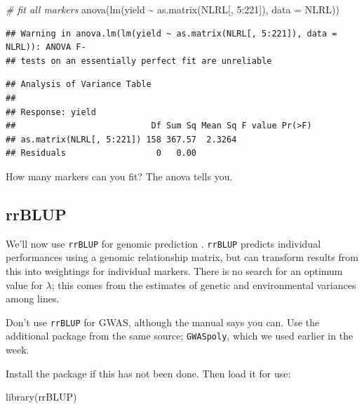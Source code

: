 \documentclass[
]{book}
\makeatletter
\newenvironment{Shaded}{\begin{snugshade}}{\end{snugshade}}
\newcommand{\AttributeTok}[1]{\textcolor[rgb]{0.77,0.63,0.00}{#1}}
\newcommand{\CommentTok}[1]{\textcolor[rgb]{0.56,0.35,0.01}{\textit{#1}}}
\newcommand{\DecValTok}[1]{\textcolor[rgb]{0.00,0.00,0.81}{#1}}
\newcommand{\FunctionTok}[1]{\textcolor[rgb]{0.00,0.00,0.00}{#1}}
\newcommand{\NormalTok}[1]{#1}
\newcommand{\SpecialCharTok}[1]{\textcolor[rgb]{0.00,0.00,0.00}{#1}}
\newenvironment{kframe}{%
\medskip{}
\setlength{\fboxsep}{.8em}
 \def\at@end@of@kframe{}%
 \ifinner\ifhmode%
  \def\at@end@of@kframe{\end{minipage}}%
  \begin{minipage}{\columnwidth}%
 \fi\fi%
 \def\FrameCommand##1{\hskip\@totalleftmargin \hskip-\fboxsep
 \colorbox{shadecolor}{##1}\hskip-\fboxsep
     \hskip-\linewidth \hskip-\@totalleftmargin \hskip\columnwidth}%
 \MakeFramed {\advance\hsize-\width
   \@totalleftmargin\z@ \linewidth\hsize
   \@setminipage}}%
 {\par\unskip\endMakeFramed%
 \at@end@of@kframe}
\newenvironment{rmdblock}[1]
  {
  \begin{itemize}
  \renewcommand{\labelitemi}{
    \raisebox{-.7\height}[0pt][0pt]{
      {\setkeys{Gin}{width=3em,keepaspectratio}\texttt{[image: images/\#1]}}
    }
  }
  \setlength{\fboxsep}{1em}
  \begin{kframe}
  \item
  }
  {
  \end{kframe}
  \end{itemize}
  }
\newenvironment{rmdnote}
  {\begin{rmdblock}{note}}
  {\end{rmdblock}}
\makeatother
\begin{document}
\begin{Shaded}
\begin{Highlighting}[]
\CommentTok{\# fit all markers}
\FunctionTok{anova}\NormalTok{(}\FunctionTok{lm}\NormalTok{(yield }\SpecialCharTok{\textasciitilde{}} \FunctionTok{as.matrix}\NormalTok{(NLRL[, }\DecValTok{5}\SpecialCharTok{:}\DecValTok{221}\NormalTok{]), }\AttributeTok{data =}\NormalTok{ NLRL))}
\end{Highlighting}
\end{Shaded}

\begin{verbatim}
## Warning in anova.lm(lm(yield ~ as.matrix(NLRL[, 5:221]), data = NLRL)): ANOVA F-
## tests on an essentially perfect fit are unreliable
\end{verbatim}

\begin{verbatim}
## Analysis of Variance Table
## 
## Response: yield
##                           Df Sum Sq Mean Sq F value Pr(>F)
## as.matrix(NLRL[, 5:221]) 158 367.57  2.3264               
## Residuals                  0   0.00
\end{verbatim}

How many markers can you fit? The anova tells you.

\hypertarget{rrblup}{%
\subsection{rrBLUP}\label{rrblup}}

We'll now use \texttt{rrBLUP} for genomic prediction . \texttt{rrBLUP} predicts individual performances
using a genomic relationship matrix, but can transform results from this into weightings for
individual markers. There is no search for an optimum value for \(λ\); this comes from the
estimates of genetic and environmental variances among lines.

\begin{rmdnote}
Don't use \texttt{rrBLUP} for GWAS, although the manual says you can. Use the additional
package from the same source; \texttt{GWASpoly}, which we used earlier in the week.
\end{rmdnote}

Install the package if this has not been done. Then load it for use:

\begin{Shaded}
\begin{Highlighting}[]
\FunctionTok{library}\NormalTok{(rrBLUP)}
\end{Highlighting}
\end{Shaded}
\end{document}
